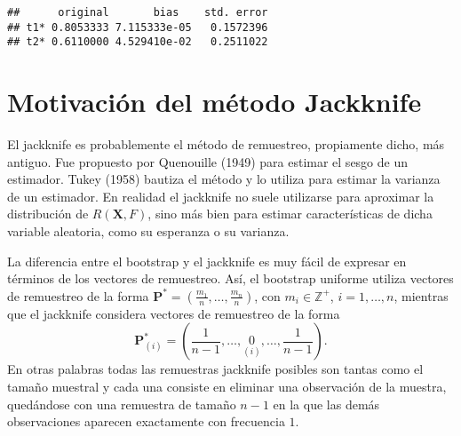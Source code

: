 \documentclass[
]{book}
\newenvironment{Shaded}{\begin{snugshade}}{\end{snugshade}}
\newcommand{\AttributeTok}[1]{\textcolor[rgb]{0.77,0.63,0.00}{#1}}
\newcommand{\ConstantTok}[1]{\textcolor[rgb]{0.00,0.00,0.00}{#1}}
\newcommand{\DecValTok}[1]{\textcolor[rgb]{0.00,0.00,0.81}{#1}}
\newcommand{\FunctionTok}[1]{\textcolor[rgb]{0.00,0.00,0.00}{#1}}
\newcommand{\NormalTok}[1]{#1}
\newcommand{\OtherTok}[1]{\textcolor[rgb]{0.56,0.35,0.01}{#1}}
\newcommand{\SpecialCharTok}[1]{\textcolor[rgb]{0.00,0.00,0.00}{#1}}
\newcommand{\StringTok}[1]{\textcolor[rgb]{0.31,0.60,0.02}{#1}}
\theoremstyle{break}
\theoremstyle{definition}
\theoremstyle{definition}
\theoremstyle{definition}
\theoremstyle{definition}
\theoremstyle{remark}
\begin{document}
\begin{Shaded}
\end{Shaded}

\begin{verbatim}
##      original       bias    std. error
## t1* 0.8053333 7.115333e-05   0.1572396
## t2* 0.6110000 4.529410e-02   0.2511022
\end{verbatim}

\hypertarget{jackknife}{%
\section{Motivación del método Jackknife}\label{jackknife}}

El jackknife es probablemente el método de remuestreo, propiamente
dicho, más antiguo. Fue propuesto por Quenouille (1949) para estimar el
sesgo de un estimador. Tukey (1958) bautiza el método y lo utiliza para
estimar la varianza de un estimador. En realidad el jackknife no suele
utilizarse para aproximar la distribución de \(R\left( \mathbf{X},F \right)\),
sino más bien para estimar características de dicha
variable aleatoria, como su esperanza o su varianza.

La diferencia entre el bootstrap y el jackknife es muy fácil de expresar
en términos de los vectores de remuestreo. Así, el bootstrap uniforme
utiliza vectores de remuestreo de la forma
\(\mathbf{P}^{\ast}=\left( \frac{m_1}{n},\ldots ,\frac{m_n}{n} \right)\), con
\(m_i\in \mathbb{Z}^{+}\), \(i=1,\ldots ,n\), mientras que el jackknife considera
vectores de remuestreo de la forma
\[\mathbf{P}_{(i)}^{\ast}=\left( \frac{1}{n-1},\ldots ,\underset{(i)}{0}
,\ldots ,\frac{1}{n-1} \right).\]
En otras palabras todas las remuestras
jackknife posibles son tantas como el tamaño muestral y cada una
consiste en eliminar una observación de la muestra, quedándose con una
remuestra de tamaño \(n-1\) en la que las demás observaciones aparecen
exactamente con frecuencia \(1\).
\end{document}
